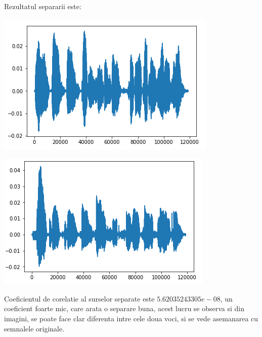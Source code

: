 \documentclass[12pt]{article}
\begin{document}
Rezultatul separarii este:
\begin{center}
	\includegraphics[scale=1]{speech_separated_1}
 \end{center}
\begin{center}
	\includegraphics[scale=1]{speech_separated_2}
 \end{center}

 Coeficientul de corelatie al surselor separate este $5.62035243305e-08$, un coeficient foarte mic, care arata o separare buna, acest lucru se observa si din imagini, se poate face clar diferenta intre cele doua voci, si se vede asemanarea cu semnalele originale.
\end{document}
